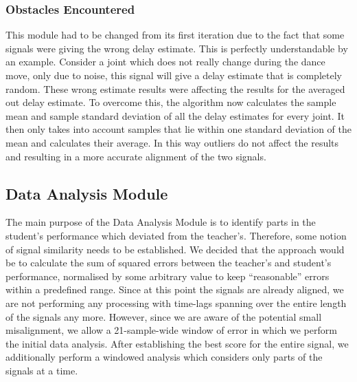 \documentclass[a4paper]{article}
\begin{document}
\subsubsection{Obstacles Encountered}
\noindent
This module had to be changed from its first iteration due to the fact that some signals were giving the wrong delay estimate. This is perfectly understandable by an example. Consider a joint which does not really change during the dance move, only due to noise, this signal will give a delay estimate that is completely random. These wrong estimate results were affecting the results for the averaged out delay estimate. To overcome this, the algorithm now calculates the sample mean and sample standard deviation of all the delay estimates for every joint. It then only takes into account samples that lie within one standard deviation of the mean and calculates their average. In this way outliers do not affect the results and resulting in a more accurate alignment of the two signals.  

\subsection{Data Analysis Module}
\noindent
The main purpose of the Data Analysis Module is to identify parts in the student's performance which deviated from the teacher's. Therefore, some notion of signal similarity needs to be established. We decided that the approach would be to calculate the sum of squared errors  between the teacher's and student's performance, normalised by some arbitrary value to keep ``reasonable'' errors within a predefined range. Since at this point the signals are already aligned, we are not performing any processing with time-lags spanning over the entire length of the signals any more. However, since we are aware of the potential small misalignment, we allow a 21-sample-wide window of error in which we perform the initial data analysis. After establishing the best score for the entire signal, we additionally perform a windowed analysis which considers only parts of the signals at a time.
\end{document}
